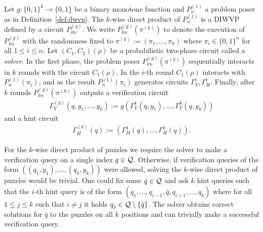 \begin{definition}
  \label{def:k_wise_direct_product}
  Let $g: \{0,1\}^{k}\!\rightarrow\!\{0,1\}$ be a binary monotone function and $P_n^{(1)}$ a problem poser as in Definition~\ref{def:dwvp}.
  The $k$-wise direct product of $P_n^{(1)}$ is a DIWVP defined by a circuit $P_{kn}^{(g)}$.
  We write $P_{kn}^{(g)}(\pi^{(k)})$ to denote the execution of $P_{kn}^{(g)}$ with the randomness fixed to $\pi^{(k)} := (\pi_1, \dots, \pi_k)$
  where $\pi_i \in \{0,1\}^n$ for all $1 \leq i \leq n$. Let $(C_1, C_2)(\rho)$ be a probabilistic two-phase circuit called a \textit{solver}.
  In the first phase, the problem poser $P_{kn}^{(g)}(\pi^{(k)})$ sequentially interacts in $k$ rounds with the circuit $C_1(\rho)$.
  In the $i$-th round $C_1(\rho)$ interacts with $P_n^{(1)}(\pi_i)$, and as the result $P_{n}^{(1)}(\pi_i)$ generates circuits $\Gamma_V^i, \Gamma_H^i$.
  Finally, after $k$ rounds $P_{kn}^{(g)}(\pi^{(k)})$ outputs a verification circuit
\begin{align*}
  \Gamma_V^{(g)} (q, y_1, \dots, y_k) := g(\Gamma_V^{1}(q, y_1), \dotsc, \Gamma_V^{k}(q, y_k))
\end{align*}
and a hint circuit
\begin{align*}
  \Gamma_H^{(k)} (q) := (\Gamma_H^{1}(q), \dotsc, \Gamma_H^{k}(q)).
\end{align*}
\end{definition}

For the $k$-wise direct product of puzzles we require the solver to make a verification query on a single index $q \in \mathcal{Q}$.
Otherwise, if verification queries of the form $((q_1,y_1), \dotsc, (q_k, y_k))$ were allowed,
solving the $k$-wise direct product of puzzles would be trivial.
One could fix some $\bar{q} \in \mathcal{Q}$ and ask
$k$ hint queries such that the $i$-th hint query is of the form $(q_1, \dotsc,q_{i-1}, \bar{q}, q_{i+1}, \dotsc, q_k)$ where
for all $1 \leq j \leq k$ such that $i \neq j$ it holds $q_j \in \mathcal{Q} \setminus \{\bar{q}\}$.
The solver obtains correct solutions for $\bar{q}$ to the puzzles on all $k$ positions and
can trivially make a successful verification query.

